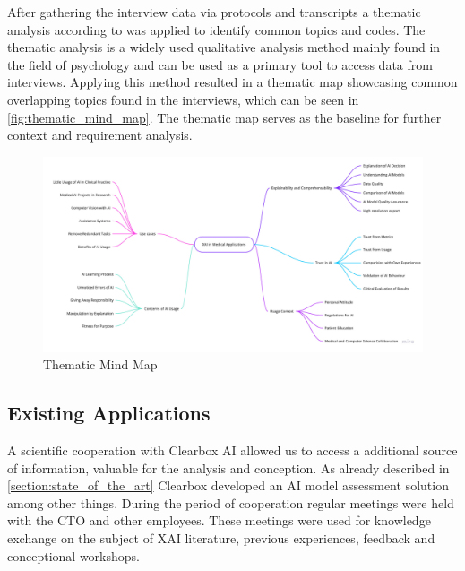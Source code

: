 \documentclass[11pt,a4paper,english]{scrreprt}
\begin{document}
After gathering the interview data via protocols and transcripts a thematic analysis according to \textcite{braun_thematical_2006} was applied to identify common topics and codes. The thematic analysis is a widely used qualitative analysis method mainly found in the field of psychology and can be used as a primary tool to access data from interviews. Applying this method resulted in a thematic map showcasing common overlapping topics found in the interviews, which can be seen in \autoref{fig:thematic_mind_map}. The thematic map serves as the baseline for further context and requirement analysis.

\begin{figure}[htbp]
    \centering
    \includegraphics[height=0.8\textwidth, angle=90]{img/figures/Thematic_Mind_Map.pdf}
    \caption{Thematic Mind Map}
    \label{fig:thematic_mind_map}
\end{figure}

\subsection{Existing Applications}\label{subsection:existing_apps}
A scientific cooperation with Clearbox AI allowed us to access a additional source of information, valuable for the analysis and conception. As already described in \autoref{section:state_of_the_art} Clearbox developed an AI model assessment solution among other things. During the period of cooperation regular meetings were held with the CTO and other employees. These meetings were used for knowledge exchange on the subject of XAI literature, previous experiences, feedback and conceptional workshops.
\end{document}
